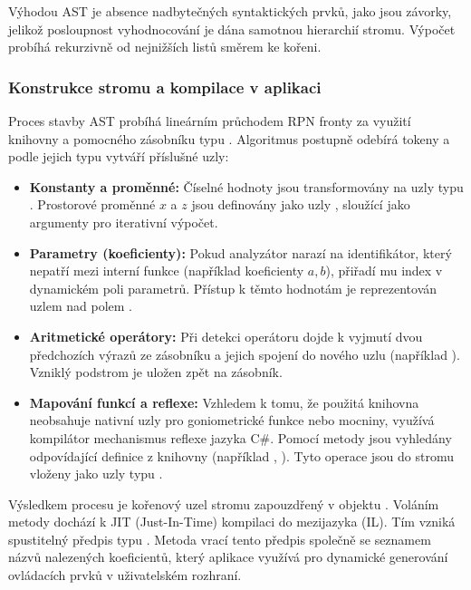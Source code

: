 \documentclass[czech, kiv, sem, he, iso690alph, pdf,viewonly]{fasthesis}
\begin{document}
Výhodou AST je absence nadbytečných syntaktických prvků, jako jsou závorky, jelikož posloupnost vyhodnocování je dána samotnou hierarchií stromu. Výpočet probíhá rekurzivně od nejnižších listů směrem ke kořeni.

\subsubsection{Konstrukce stromu a kompilace v aplikaci}
Proces stavby AST probíhá lineárním průchodem RPN fronty za využití knihovny  \cite{microsoft_docs_expressions} a pomocného zásobníku typu . 
Algoritmus postupně odebírá tokeny a podle jejich typu vytváří příslušné uzly:

\begin{itemize}
    \item \textbf{Konstanty a proměnné:} Číselné hodnoty jsou transformovány na uzly typu . Prostorové proměnné $x$ a $z$ jsou definovány jako uzly , sloužící jako argumenty pro iterativní výpočet.
    \item \textbf{Parametry (koeficienty):} Pokud analyzátor narazí na identifikátor, který nepatří mezi interní funkce (například koeficienty $a, b$), přiřadí mu index v dynamickém poli parametrů. Přístup k těmto hodnotám je reprezentován uzlem  nad polem .
    \item \textbf{Aritmetické operátory:} Při detekci operátoru dojde k vyjmutí dvou předchozích výrazů ze zásobníku a jejich spojení do nového uzlu (například ). Vzniklý podstrom je uložen zpět na zásobník.
    \item \textbf{Mapování funkcí a reflexe:} Vzhledem k tomu, že použitá knihovna neobsahuje nativní uzly pro goniometrické funkce nebo mocniny, využívá kompilátor mechanismus reflexe jazyka C\#. Pomocí metody  jsou vyhledány odpovídající definice z knihovny  (například , ). Tyto operace jsou do stromu vloženy jako uzly typu .
\end{itemize}

Výsledkem procesu je kořenový uzel stromu zapouzdřený v objektu . Voláním metody  dochází k JIT (Just-In-Time) kompilaci do mezijazyka  (IL). Tím vzniká spustitelný předpis typu . Metoda  vrací tento předpis společně se seznamem názvů nalezených koeficientů, který aplikace využívá pro dynamické generování ovládacích prvků v uživatelském rozhraní.
\end{document}
